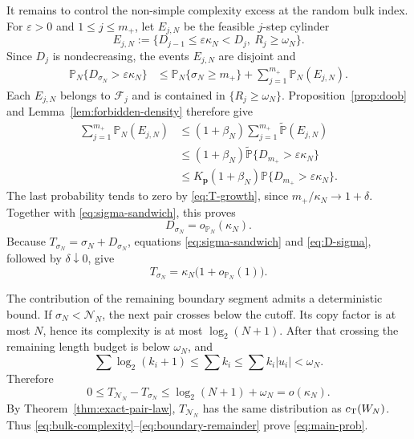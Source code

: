 \documentclass[journal]{IEEEtran}
\theoremstyle{plain}
\theoremstyle{definition}
\theoremstyle{remark}
\newcommand{\F}{\mathcal F}
\newcommand{\Pideal}{\mathbb P}
\newcommand{\Pforb}{\widetilde{\mathbb P}}
\newcommand{\Pbound}{\mathbb P_N}
\newcommand{\cT}{c_{\rm T}}
\begin{document}
It remains to control the non-simple complexity excess at the random bulk index.  For $\varepsilon>0$ and $1\le j\le m_+$, let $E_{j,N}$ be the feasible $j$-step cylinder
\begin{equation*}
 E_{j,N}:=\{D_{j-1}\le\varepsilon\kappa_N<D_j,\ R_j\ge\omega_N\}.
\end{equation*}
Since $D_j$ is nondecreasing, the events $E_{j,N}$ are disjoint and
\begin{align}
 \Pbound\{D_{\sigma_N}>\varepsilon\kappa_N\}
 &\le \Pbound\{\sigma_N\ge m_+\}
      +\sum_{j=1}^{m_+}\Pbound(E_{j,N}).
 \label{eq:D-sigma-bound}
\end{align}
Each $E_{j,N}$ belongs to $\F_j$ and is contained in $\{R_j\ge\omega_N\}$.  Proposition~\ref{prop:doob} and Lemma~\ref{lem:forbidden-density} therefore give
\begin{align*}
 \sum_{j=1}^{m_+}\Pbound(E_{j,N})
 &\le(1+\beta_N)\sum_{j=1}^{m_+}\Pforb(E_{j,N})\\
 &\le(1+\beta_N)\Pforb\{D_{m_+}>\varepsilon\kappa_N\}\\
 &\le K_{\mathbf p}(1+\beta_N)
      \Pideal\{D_{m_+}>\varepsilon\kappa_N\}.
\end{align*}
The last probability tends to zero by \eqref{eq:T-growth}, since $m_+/\kappa_N\to1+\delta$.  Together with \eqref{eq:sigma-sandwich}, this proves
\begin{equation}\label{eq:D-sigma}
 D_{\sigma_N}=o_{\Pbound}(\kappa_N).
\end{equation}
Because $T_{\sigma_N}=\sigma_N+D_{\sigma_N}$, equations \eqref{eq:sigma-sandwich} and \eqref{eq:D-sigma}, followed by $\delta\downarrow0$, give
\begin{equation}\label{eq:bulk-complexity}
 T_{\sigma_N}=\kappa_N\bigl(1+o_{\Pbound}(1)\bigr).
\end{equation}

The contribution of the remaining boundary segment admits a deterministic bound.  If $\sigma_N<\mathcal N_N$, the next pair crosses below the cutoff.  Its copy factor is at most $N$, hence its complexity is at most $\log_2(N+1)$.  After that crossing the remaining length budget is below $\omega_N$, and
\begin{equation*}
 \sum\log_2(k_i+1)\le\sum k_i
 \le\sum k_i|u_i|<\omega_N.
\end{equation*}
Therefore
\begin{equation}\label{eq:boundary-remainder}
 0\le T_{\mathcal N_N}-T_{\sigma_N}
 \le\log_2(N+1)+\omega_N
 =o(\kappa_N).
\end{equation}
By Theorem~\ref{thm:exact-pair-law}, $T_{\mathcal N_N}$ has the same distribution as $\cT(W_N)$.  Thus \eqref{eq:bulk-complexity}--\eqref{eq:boundary-remainder} prove \eqref{eq:main-prob}.
\end{document}
